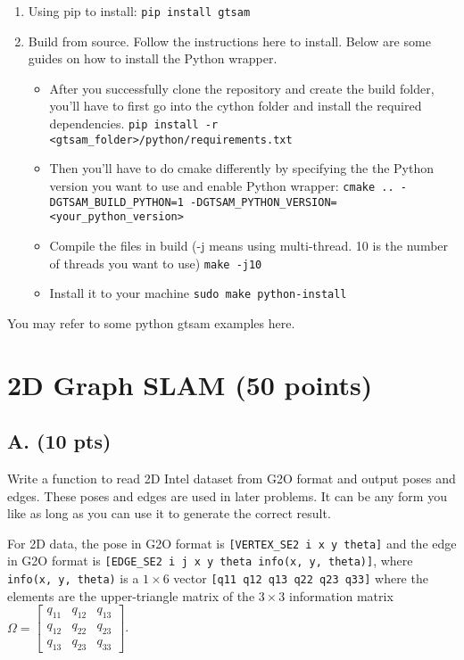 \documentclass[tp]{lcc}
\begin{document}
\begin{enumerate}
    \item Using pip to install: \texttt{pip install gtsam}
    \item Build from source. Follow the instructions here to install. Below are some guides on how to install the Python wrapper.
    \begin{itemize}
        \item After you successfully clone the repository and create the build folder, you'll have to first go into the cython folder and install the required dependencies. \texttt{pip install -r <gtsam\_folder>/python/requirements.txt}
        \item Then you'll have to do cmake differently by specifying the the Python version you want to use and enable Python wrapper: \texttt{cmake .. -DGTSAM\_BUILD\_PYTHON=1 -DGTSAM\_PYTHON\_VERSION=<your\_python\_version>}
        \item Compile the files in build (-j means using multi-thread. 10 is the number of threads you want to use) \texttt{make -j10}
        \item Install it to your machine \texttt{sudo make python-install}
    \end{itemize}
\end{enumerate}

You may refer to some python gtsam examples here.

\section{2D Graph SLAM (50 points)}
\subsection{A. (10 pts)}
Write a function to read 2D Intel dataset from G2O format and output poses and edges. These poses and edges are used in later problems. It can be any form you like as long as you can use it to generate the correct result.

For 2D data, the pose in G2O format is \texttt{[VERTEX\_SE2 i x y theta]} and the edge in G2O format is \texttt{[EDGE\_SE2 i j x y theta info(x, y, theta)]}, where \texttt{info(x, y, theta)} is a $1 \times 6$ vector \texttt{[q11 q12 q13 q22 q23 q33]} where the elements are the upper-triangle matrix of the $3 \times 3$ information matrix $\Omega = \begin{bmatrix} q_{11} & q_{12} & q_{13} \\ q_{12} & q_{22} & q_{23} \\ q_{13} & q_{23} & q_{33} \end{bmatrix}$.
\end{document}

